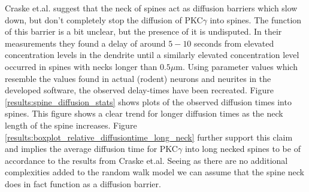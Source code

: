 Craske et.al. suggest that the neck of spines act as diffusion barriers which slow down, but don't completely stop the diffusion of PKC$\gamma$ into spines. 
The function of this barrier is a bit unclear, but the presence of it is undisputed. 
In their measurements they found a delay of around $5-10$ seconds from elevated concentration levels in the dendrite until a similarly elevated concentration level occurred in spines with necks longer than $0.5\mu$m. 
Using parameter values which resemble the values found in actual (rodent) neurons and neurites in the developed software, the observed delay-times have been recreated. 
Figure \ref{results:spine_diffusion_stats} shows plots of the observed diffusion times into spines. 
This figure shows a clear trend for longer diffusion times as the neck length of the spine increases. 
Figure \ref{results:boxplot_relative_diffusiontime_long_neck} further support this claim and implies the average diffusion time for PKC$\gamma$ into long necked spines to be of accordance to the results from Craske et.al.
Seeing as there are no additional complexities added to the random walk model we can assume that the spine neck does in fact function as a diffusion barrier.

